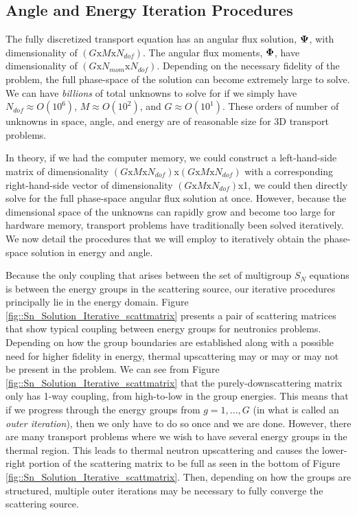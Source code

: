 \subsection{Angle and Energy Iteration Procedures}
\label{sec::Sn_Solution_Iterative}

The fully discretized transport equation has an angular flux solution, ${\bf \Psi}$, with dimensionality of $(G \text{x} M \text{x} N_{dof})$. The angular flux moments, ${\bf \Phi}$, have dimensionality of $(G \text{x} N_{mom} \text{x} N_{dof})$. Depending on the necessary fidelity of the problem, the full phase-space of the solution can become extremely large to solve. We can have {\em billions} of total unknowns to solve for if we simply have $N_{dof} \approx O(10^6)$, $M \approx O(10^2)$, and $G \approx O(10^1)$. These orders of number of unknowns in space, angle, and energy are of reasonable size for 3D transport problems.

In theory, if we had the computer memory, we could construct a left-hand-side matrix of dimensionality $(G \text{x} M \text{x} N_{dof})$x$(G \text{x} M \text{x} N_{dof})$ with a corresponding right-hand-side vector of dimensionality $(G \text{x} M \text{x} N_{dof})$x1, we could then directly solve for the full phase-space angular flux solution at once. However, because the dimensional space of the unknowns can rapidly grow and become too large for hardware memory, transport problems have traditionally been solved iteratively. We now detail the procedures that we will employ to iteratively obtain the phase-space solution in energy and angle.

Because the only coupling that arises between the set of multigroup $S_N$ equations is between the energy groups in the scattering source, our iterative procedures principally lie in the energy domain. Figure \ref{fig::Sn_Solution_Iterative_scattmatrix} presents a pair of scattering matrices that show typical coupling between energy groups for neutronics problems. Depending on how the group boundaries are established along with a possible need for higher fidelity in energy, thermal upscattering may or may or may not be present in the problem. We can see from Figure \ref{fig::Sn_Solution_Iterative_scattmatrix} that the purely-downscattering matrix only has 1-way coupling, from high-to-low in the group energies. This means that if we progress through the energy groups from $g=1,...,G$ (in what is called an {\em outer iteration}), then we only have to do so once and we are done. However, there are many transport problems where we wish to have several energy groups in the thermal region. This leads to thermal neutron upscattering and causes the lower-right portion of the scattering matrix to be full as seen in the bottom of Figure \ref{fig::Sn_Solution_Iterative_scattmatrix}. Then, depending on how the groups are structured, multiple outer iterations may be necessary to fully converge the scattering source.


